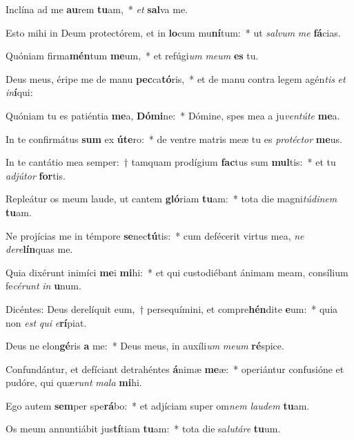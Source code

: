 \item Inclína ad me \textbf{au}rem \textbf{tu}am,~* \textit{et} \textbf{sal}va me.
\item Esto mihi in Deum protectórem, et in \textbf{lo}cum mu\textbf{ní}tum:~* ut \textit{sal}\textit{vum} \textit{me} \textbf{fá}cias.
\item Quóniam firma\textbf{mén}tum \textbf{me}um,~* et refúgi\textit{um} \textit{me}\textit{um} \textbf{es} tu.
\item Deus meus, éripe me de manu \textbf{pec}ca\textbf{tó}ris,~* et de manu contra legem agén\textit{tis} \textit{et} \textit{in}\textbf{í}qui:
\item Quóniam tu es patiéntia \textbf{me}a, \textbf{Dó}\textbf{mi}ne:~* Dómine, spes mea a ju\textit{ven}\textit{tú}\textit{te} \textbf{me}a.
\item In te confirmátus \textbf{sum} ex \textbf{ú}\textbf{te}ro:~* de ventre matris meæ tu es \textit{pro}\textit{téc}\textit{tor} \textbf{me}us.
\item In te cantátio mea semper:~† tamquam prodígium \textbf{fac}tus sum \textbf{mul}tis:~* et tu \textit{ad}\textit{jú}\textit{tor} \textbf{for}tis.
\item Repleátur os meum laude, ut cantem \textbf{gló}riam \textbf{tu}am:~* tota die magni\textit{tú}\textit{di}\textit{nem} \textbf{tu}am.
\item Ne projícias me in témpore \textbf{se}nec\textbf{tú}tis:~* cum defécerit virtus mea, \textit{ne} \textit{de}\textit{re}\textbf{lín}quas me.
\item Quia dixérunt inimíci \textbf{me}i \textbf{mi}hi:~* et qui custodiébant ánimam meam, consílium fe\textit{cé}\textit{runt} \textit{in} \textbf{u}num.
\item Dicéntes: Deus derelíquit eum,~† persequímini, et compre\textbf{hén}dite \textbf{e}um:~* quia non \textit{est} \textit{qui} \textit{e}\textbf{rí}piat.
\item Deus ne elon\textbf{gé}ris \textbf{a} me:~* Deus meus, in auxíli\textit{um} \textit{me}\textit{um} \textbf{ré}spice.
\item Confundántur, et defíciant detrahéntes \textbf{á}nimæ \textbf{me}æ:~* operiántur confusióne et pudóre, qui quæ\textit{runt} \textit{ma}\textit{la} \textbf{mi}hi.
\item Ego autem \textbf{sem}per spe\textbf{rá}bo:~* et adjíciam super om\textit{nem} \textit{lau}\textit{dem} \textbf{tu}am.
\item Os meum annuntiábit jus\textbf{tí}tiam \textbf{tu}am:~* tota die sa\textit{lu}\textit{tá}\textit{re} \textbf{tu}um.
